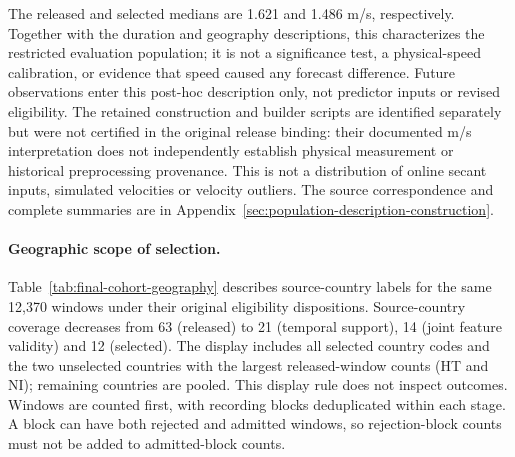 \documentclass[11pt]{article}
\begin{document}
The released and selected medians are 1.621 and 1.486 m/s, respectively.
Together with the duration and geography descriptions, this characterizes
the restricted evaluation population; it is not a significance test,
a physical-speed calibration, or evidence that speed caused any forecast
difference. Future observations enter this post-hoc description only,
not predictor inputs or revised eligibility. The retained construction and
builder scripts are identified separately but were not certified in the
original release binding: their documented m/s interpretation does not
independently establish physical measurement or historical preprocessing
provenance. This is not a distribution of online secant inputs, simulated
velocities or velocity outliers. The source correspondence and complete
summaries are in Appendix~\ref{sec:population-description-construction}.

\paragraph{Geographic scope of selection.}\label{sec:final-cohort-geography}
Table~\ref{tab:final-cohort-geography} describes source-country labels for
the same 12,370 windows under their original eligibility dispositions.
Source-country coverage decreases from 63 (released) to 21 (temporal support),
14 (joint feature validity) and 12 (selected).
The display includes all selected country codes and the two unselected
countries with the largest released-window counts (HT and NI); remaining
countries are pooled. This display rule does not inspect outcomes.
Windows are counted first, with recording blocks deduplicated within each stage.
A block can have both rejected and admitted windows, so rejection-block
counts must not be added to admitted-block counts.
\end{document}
